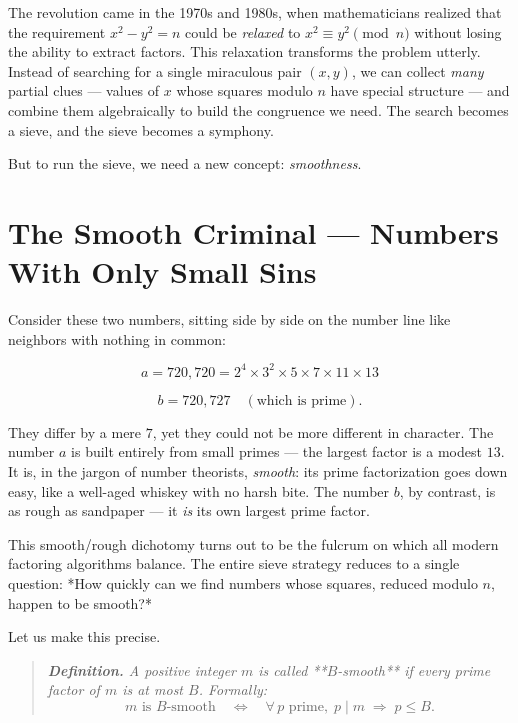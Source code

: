 The revolution came in the 1970s and 1980s, when mathematicians realized that the requirement $x^2 - y^2 = n$ could be \textit{relaxed} to $x^2 \equiv y^2 \pmod{n}$ without losing the ability to extract factors. This relaxation transforms the problem utterly. Instead of searching for a single miraculous pair $(x, y)$, we can collect \textit{many} partial clues --- values of $x$ whose squares modulo $n$ have special structure --- and combine them algebraically to build the congruence we need. The search becomes a sieve, and the sieve becomes a symphony.

But to run the sieve, we need a new concept: \textit{smoothness}.


\bigskip


\section{The Smooth Criminal --- Numbers With Only Small Sins}

Consider these two numbers, sitting side by side on the number line like neighbors with nothing in common:

\[
a = 720{,}720 = 2^4 \times 3^2 \times 5 \times 7 \times 11 \times 13
\]

\[
b = 720{,}727 \quad (\text{which is prime}).
\]

They differ by a mere $7$, yet they could not be more different in character. The number $a$ is built entirely from small primes --- the largest factor is a modest $13$. It is, in the jargon of number theorists, \textit{smooth}: its prime factorization goes down easy, like a well-aged whiskey with no harsh bite. The number $b$, by contrast, is as rough as sandpaper --- it \textit{is} its own largest prime factor.

This smooth/rough dichotomy turns out to be the fulcrum on which all modern factoring algorithms balance. The entire sieve strategy reduces to a single question: *How quickly can we find numbers whose squares, reduced modulo $n$, happen to be smooth?*

Let us make this precise.

\begin{quote}
\itshape \textbf{Definition.} A positive integer $m$ is called **$B$-smooth** if every prime factor of $m$ is at most $B$. Formally: $$m \text{ is } B\text{-smooth} \quad\Longleftrightarrow\quad \forall\, p \text{ prime},\; p \mid m \;\Rightarrow\; p \leq B.$$
\end{quote}

